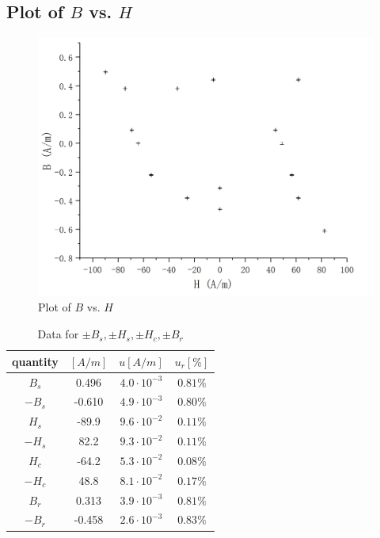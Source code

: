 \documentclass[12pt]{article}
\begin{document}
\subsection{Plot of $B$ vs. $H$}
\begin{figure}[H]
\centering
\includegraphics[scale=0.4]{P6.jpg}
\caption{Plot of $B$ vs. $H$}
\end{figure}
\begin{table}[H]
\centering
\begin{tabular}{|c|c|c|c|}
\hline
quantity &  $[A/m]$      & $u[A/m]$   & $u_r [\%]$ \\ \hline
$B_s$     & 0.496  & $4.0\cdot 10^{-3}$ & $0.81\%$ \\ \hline
$-B_s$    & -0.610 &$4.9\cdot 10^{-3}$ & $0.80\%$ \\ \hline
$H_s$     & -89.9  & $9.6\cdot 10^{-2}$ & $0.11\%$ \\ \hline
$-H_s$    & 82.2   & $9.3\cdot 10^{-2}$ & $0.11\%$ \\ \hline
$H_c$     & -64.2  & $5.3\cdot 10^{-2}$ & $0.08\%$ \\ \hline
$-H_c$    & 48.8   & $8.1\cdot 10^{-2}$ & $0.17\%$\\ \hline
$B_r$     & 0.313  & $3.9\cdot 10^{-3}$ & $0.81\%$\\ \hline
$-B_r$    & -0.458 & $2.6\cdot 10^{-3}$ & $0.83\%$\\ \hline
\end{tabular}
\caption{Data for $\pm B_s,\pm H_s,\pm H_c,\pm B_r$}
\end{table}
\end{document}
